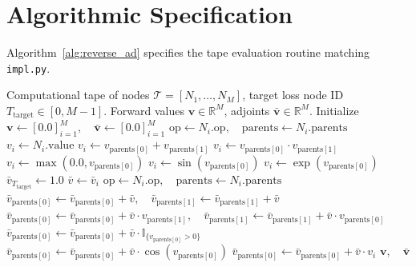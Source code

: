 \documentclass[11pt]{article}
\begin{document}
\section{Algorithmic Specification}
\label{sec:algorithm}

Algorithm~\ref{alg:reverse_ad} specifies the tape evaluation routine matching \texttt{impl.py}.

\begin{algorithm}[H]
\caption{Reverse-Mode Automatic Differentiation on Computational DAG Tapes}
\label{alg:reverse_ad}
\begin{algorithmic}[1]
\Require Computational tape of nodes $\mathcal{T} = [N_1, \dots, N_M]$, target loss node ID $T_{\mathrm{target}} \in [0, M-1]$.
\Ensure Forward values $\mathbf{v} \in \mathbb{R}^M$, adjoints $\bar{\mathbf{v}} \in \mathbb{R}^M$.
\State Initialize $\mathbf{v} \gets [0.0]_{i=1}^M, \quad \bar{\mathbf{v}} \gets [0.0]_{i=1}^M$
 
    \State $\mathrm{op} \gets N_i.\mathrm{op}, \quad \mathrm{parents} \gets N_i.\mathrm{parents}$
        \State $v_i \gets N_i.\mathrm{value}$
        \State $v_i \gets v_{\mathrm{parents}[0]} + v_{\mathrm{parents}[1]}$
        \State $v_i \gets v_{\mathrm{parents}[0]} \cdot v_{\mathrm{parents}[1]}$
        \State $v_i \gets \max(0.0, v_{\mathrm{parents}[0]})$
        \State $v_i \gets \sin(v_{\mathrm{parents}[0]})$
        \State $v_i \gets \exp(v_{\mathrm{parents}[0]})$
    \EndIf
\EndFor
\State $\bar{v}_{T_{\mathrm{target}}} \gets 1.0$ 
 
    \State $\bar{v} \gets \bar{v}_i$
        \State $\mathrm{op} \gets N_i.\mathrm{op}, \quad \mathrm{parents} \gets N_i.\mathrm{parents}$
            \State $\bar{v}_{\mathrm{parents}[0]} \gets \bar{v}_{\mathrm{parents}[0]} + \bar{v}, \quad \bar{v}_{\mathrm{parents}[1]} \gets \bar{v}_{\mathrm{parents}[1]} + \bar{v}$
            \State $\bar{v}_{\mathrm{parents}[0]} \gets \bar{v}_{\mathrm{parents}[0]} + \bar{v} \cdot v_{\mathrm{parents}[1]}, \quad \bar{v}_{\mathrm{parents}[1]} \gets \bar{v}_{\mathrm{parents}[1]} + \bar{v} \cdot v_{\mathrm{parents}[0]}$
            \State $\bar{v}_{\mathrm{parents}[0]} \gets \bar{v}_{\mathrm{parents}[0]} + \bar{v} \cdot \mathbb{I}_{\{v_{\mathrm{parents}[0]} > 0\}}$
            \State $\bar{v}_{\mathrm{parents}[0]} \gets \bar{v}_{\mathrm{parents}[0]} + \bar{v} \cdot \cos(v_{\mathrm{parents}[0]})$
            \State $\bar{v}_{\mathrm{parents}[0]} \gets \bar{v}_{\mathrm{parents}[0]} + \bar{v} \cdot v_i$
        \EndIf
    \EndIf
\EndFor
\State \Return $\mathbf{v}, \quad \bar{\mathbf{v}}$
\end{algorithmic}
\end{algorithm}
\end{document}
